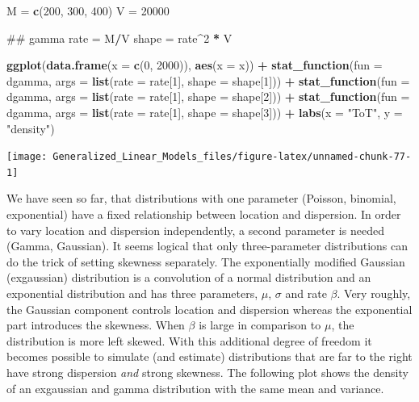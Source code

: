 \documentclass[]{svmono}
\newenvironment{Shaded}{\begin{snugshade}}{\end{snugshade}}
\newcommand{\KeywordTok}[1]{\textcolor[rgb]{0.13,0.29,0.53}{\textbf{#1}}}
\newcommand{\DataTypeTok}[1]{\textcolor[rgb]{0.13,0.29,0.53}{#1}}
\newcommand{\DecValTok}[1]{\textcolor[rgb]{0.00,0.00,0.81}{#1}}
\newcommand{\StringTok}[1]{\textcolor[rgb]{0.31,0.60,0.02}{#1}}
\newcommand{\OperatorTok}[1]{\textcolor[rgb]{0.81,0.36,0.00}{\textbf{#1}}}
\newcommand{\NormalTok}[1]{#1}
\begin{document}
\begin{Shaded}
\begin{Highlighting}[]
\NormalTok{M =}\StringTok{ }\KeywordTok{c}\NormalTok{(}\DecValTok{200}\NormalTok{, }\DecValTok{300}\NormalTok{, }\DecValTok{400}\NormalTok{)}
\NormalTok{V =}\StringTok{ }\DecValTok{20000}

\NormalTok{## gamma}
\NormalTok{rate =}\StringTok{ }\NormalTok{M}\OperatorTok{/}\NormalTok{V}
\NormalTok{shape =}\StringTok{ }\NormalTok{rate}\OperatorTok{^}\DecValTok{2} \OperatorTok{*}\StringTok{ }\NormalTok{V}

\KeywordTok{ggplot}\NormalTok{(}\KeywordTok{data.frame}\NormalTok{(}\DataTypeTok{x =} \KeywordTok{c}\NormalTok{(}\DecValTok{0}\NormalTok{, }\DecValTok{2000}\NormalTok{)), }\KeywordTok{aes}\NormalTok{(}\DataTypeTok{x =}\NormalTok{ x)) }\OperatorTok{+}
\StringTok{  }\KeywordTok{stat_function}\NormalTok{(}\DataTypeTok{fun =}\NormalTok{ dgamma, }
                \DataTypeTok{args =} \KeywordTok{list}\NormalTok{(}\DataTypeTok{rate =}\NormalTok{ rate[}\DecValTok{1}\NormalTok{], }\DataTypeTok{shape =}\NormalTok{ shape[}\DecValTok{1}\NormalTok{])) }\OperatorTok{+}
\StringTok{  }\KeywordTok{stat_function}\NormalTok{(}\DataTypeTok{fun =}\NormalTok{ dgamma, }
                \DataTypeTok{args =} \KeywordTok{list}\NormalTok{(}\DataTypeTok{rate =}\NormalTok{ rate[}\DecValTok{1}\NormalTok{], }\DataTypeTok{shape =}\NormalTok{ shape[}\DecValTok{2}\NormalTok{])) }\OperatorTok{+}
\StringTok{  }\KeywordTok{stat_function}\NormalTok{(}\DataTypeTok{fun =}\NormalTok{ dgamma, }
                \DataTypeTok{args =} \KeywordTok{list}\NormalTok{(}\DataTypeTok{rate =}\NormalTok{ rate[}\DecValTok{1}\NormalTok{], }\DataTypeTok{shape =}\NormalTok{ shape[}\DecValTok{3}\NormalTok{])) }\OperatorTok{+}
\StringTok{  }\KeywordTok{labs}\NormalTok{(}\DataTypeTok{x =} \StringTok{"ToT"}\NormalTok{, }\DataTypeTok{y =} \StringTok{"density"}\NormalTok{)}
\end{Highlighting}
\end{Shaded}

\texttt{[image: Generalized\_Linear\_Models\_files/figure-latex/unnamed-chunk-77-1]}

We have seen so far, that distributions with one parameter (Poisson,
binomial, exponential) have a fixed relationship between location and
dispersion. In order to vary location and dispersion independently, a
second parameter is needed (Gamma, Gaussian). It seems logical that only
three-parameter distributions can do the trick of setting skewness
separately. The exponentially modified Gaussian (exgaussian)
distribution is a convolution of a normal distribution and an
exponential distribution and has three parameters, \(\mu\), \(\sigma\)
and rate \(\beta\). Very roughly, the Gaussian component controls
location and dispersion whereas the exponential part introduces the
skewness. When \(\beta\) is large in comparison to \(\mu\), the
distribution is more left skewed. With this additional degree of freedom
it becomes possible to simulate (and estimate) distributions that are
far to the right have strong dispersion \emph{and} strong skewness. The
following plot shows the density of an exgaussian and gamma distribution
with the same mean and variance.
\end{document}
